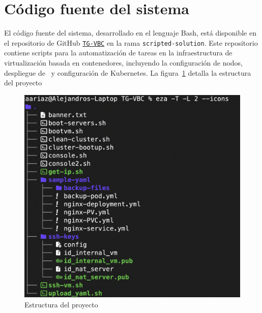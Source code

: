 \section{Código fuente del sistema}
\noindent
El código fuente del sistema, desarrollado en el lenguaje Bash, está disponible en el repositorio de GitHub \href{https://github.com/AariazP/TG-VBC.git}{\texttt{TG-VBC}} en la rama \texttt{scripted-solution}. Este repositorio contiene scripts para la automatización de tareas en la infraestructura de virtualización basada en contenedores, incluyendo la configuración de nodos, despliegue de \VM\ y configuración de Kubernetes. 
La figura~\ref{fig:estructura-proyecto} detalla la estructura del proyecto
\begin{figure}[H]
    \centering
    \includegraphics[scale=0.4]{tablas-images/cp6/src/tree.png}
    \caption{Estructura del proyecto}\label{fig:estructura-proyecto}
\end{figure}